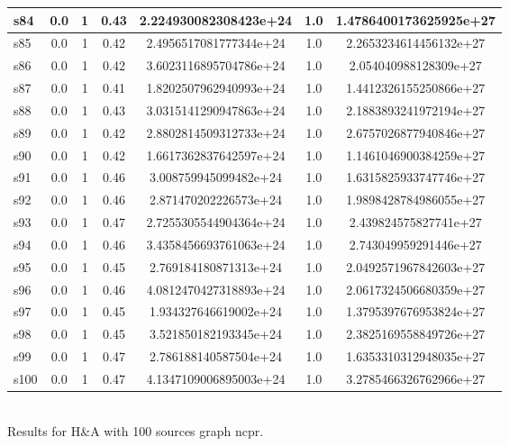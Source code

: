 \documentclass{article}
\begin{document}
\begin{tabular}{|l|c|c|c|c|c|c|}
s84 &0.0 & 1 & 0.43 & 2.224930082308423e+24 & 1.0 & 1.4786400173625925e+27\\
\hline
s85 &0.0 & 1 & 0.42 & 2.4956517081777344e+24 & 1.0 & 2.2653234614456132e+27\\
\hline
s86 &0.0 & 1 & 0.42 & 3.6023116895704786e+24 & 1.0 & 2.054040988128309e+27\\
\hline
s87 &0.0 & 1 & 0.41 & 1.8202507962940993e+24 & 1.0 & 1.4412326155250866e+27\\
\hline
s88 &0.0 & 1 & 0.43 & 3.0315141290947863e+24 & 1.0 & 2.1883893241972194e+27\\
\hline
s89 &0.0 & 1 & 0.42 & 2.8802814509312733e+24 & 1.0 & 2.6757026877940846e+27\\
\hline
s90 &0.0 & 1 & 0.42 & 1.6617362837642597e+24 & 1.0 & 1.1461046900384259e+27\\
\hline
s91 &0.0 & 1 & 0.46 & 3.008759945099482e+24 & 1.0 & 1.6315825933747746e+27\\
\hline
s92 &0.0 & 1 & 0.46 & 2.871470202226573e+24 & 1.0 & 1.9898428784986055e+27\\
\hline
s93 &0.0 & 1 & 0.47 & 2.7255305544904364e+24 & 1.0 & 2.439824575827741e+27\\
\hline
s94 &0.0 & 1 & 0.46 & 3.4358456693761063e+24 & 1.0 & 2.743049959291446e+27\\
\hline
s95 &0.0 & 1 & 0.45 & 2.769184180871313e+24 & 1.0 & 2.0492571967842603e+27\\
\hline
s96 &0.0 & 1 & 0.46 & 4.0812470427318893e+24 & 1.0 & 2.0617324506680359e+27\\
\hline
s97 &0.0 & 1 & 0.45 & 1.934327646619002e+24 & 1.0 & 1.3795397676953824e+27\\
\hline
s98 &0.0 & 1 & 0.45 & 3.521850182193345e+24 & 1.0 & 2.3825169558849726e+27\\
\hline
s99 &0.0 & 1 & 0.47 & 2.786188140587504e+24 & 1.0 & 1.6353310312948035e+27\\
\hline
s100 &0.0 & 1 & 0.47 & 4.1347109006895003e+24 & 1.0 & 3.2785466326762966e+27\\
\hline
\end{tabular}\\

\noindent Results for H\&A with 100 sources graph ncpr.
\end{document}
